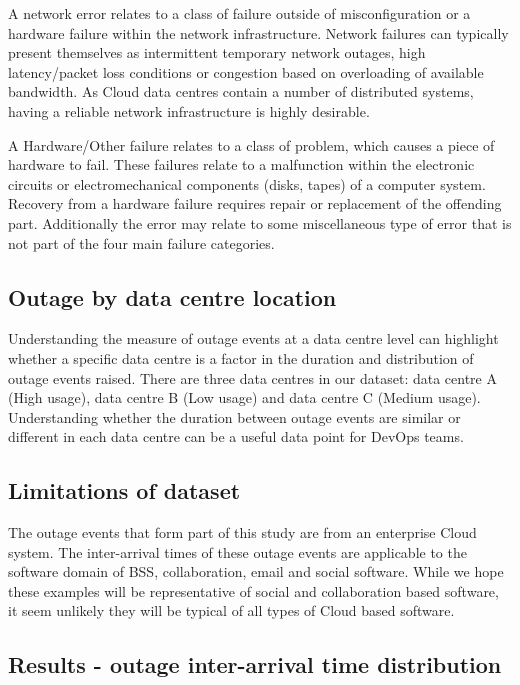 A network error relates to a class of failure outside of misconfiguration or a hardware failure within the network infrastructure. Network failures can typically present themselves as intermittent temporary network outages, high latency/packet loss conditions or congestion based on overloading of available bandwidth. As Cloud data centres contain a number of distributed systems, having a reliable network infrastructure is highly desirable. \par

A Hardware/Other failure relates to a class of problem, which causes a piece of hardware to fail. These failures relate to a malfunction within the electronic circuits or electromechanical components (disks, tapes) of a computer system. Recovery from a hardware failure requires repair or replacement of the offending part. Additionally the error may relate to some miscellaneous type of error that is not part of the four main failure categories. \par

\subsection{Outage by data centre location}

Understanding the measure of outage events at a data centre level can highlight whether a specific data centre is a factor in the duration and distribution of outage events raised. There are three data centres in our dataset: data centre A (High usage), data centre B (Low usage) and data centre C (Medium usage). Understanding whether the duration between outage events are similar or different in each data centre can be a useful data point for DevOps teams.

\subsection{Limitations of dataset}

The outage events that form part of this study are from an enterprise Cloud system. The inter-arrival times of these outage events are applicable to the software domain of BSS, collaboration, email and social software. While we hope these examples will be representative of social and collaboration based software, it seem unlikely they will be
typical of all types of Cloud based software.

\subsection{Results - outage inter-arrival time distribution}

